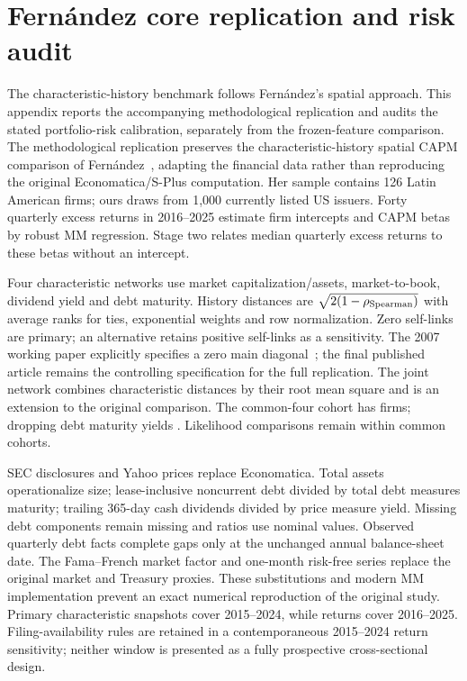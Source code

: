 \documentclass[11pt]{article}
\begin{document}
\clearpage
\section{Fern\'andez core replication and risk audit}\label{sec:replication}
The characteristic-history benchmark follows Fern\'andez's spatial approach.
This appendix reports the accompanying methodological replication and audits
the stated portfolio-risk calibration, separately from the frozen-feature
comparison. The methodological replication preserves the
characteristic-history spatial
CAPM comparison of Fern\'andez~\cite{fernandez}, adapting the financial data
rather than reproducing the original Economatica/S-Plus computation. Her sample
contains 126 Latin American firms; ours draws from 1,000 currently listed US
issuers. Forty quarterly excess returns in 2016--2025 estimate firm intercepts
and CAPM betas by robust MM regression. Stage two relates median quarterly
excess returns to these betas without an intercept.

Four characteristic networks use market capitalization/assets, market-to-book,
dividend yield and debt maturity. History distances are
$\sqrt{2(1-\rho_{\rm Spearman})}$ with average ranks for ties, exponential
weights and row normalization. Zero self-links are primary; an alternative
retains positive self-links as a sensitivity. The 2007 working paper explicitly
specifies a zero main diagonal~\cite{fernandezworking}; the final published
article remains the controlling specification for the full replication.
The joint network combines characteristic distances
by their root mean square and is an extension to the original comparison.
The common-four cohort has \ReplicationFourFirms{} firms; dropping debt maturity
yields \ReplicationThreeFirms{}.
Likelihood comparisons remain within common cohorts.

SEC disclosures and Yahoo prices replace Economatica. Total assets
operationalize
size; lease-inclusive noncurrent debt divided by total debt measures maturity;
trailing 365-day cash dividends divided by price measure yield. Missing debt
components remain missing and ratios use nominal values. Observed quarterly
debt facts complete gaps only at the unchanged annual balance-sheet date. The
Fama--French %
market factor and one-month risk-free series replace the original market and
Treasury proxies. These substitutions and modern MM implementation prevent an
exact numerical reproduction of the original study. Primary characteristic
snapshots cover 2015--2024, while returns cover 2016--2025. Filing-availability
rules are retained in a contemporaneous 2015--2024 return sensitivity; neither
window is presented as a fully prospective cross-sectional design.
\end{document}
